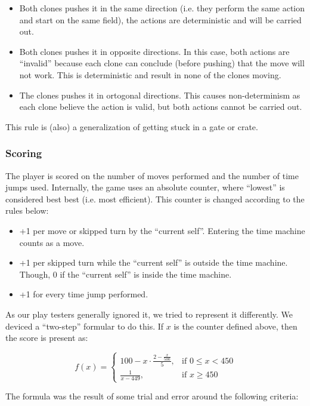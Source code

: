 \begin{itemize}
\item Both clones pushes it in the same direction (i.e. they perform
  the same action and start on the same field), the actions are
  deterministic and will be carried out.
\item Both clones pushes it in opposite directions.  In this case,
  both actions are ``invalid'' because each clone can conclude (before
  pushing) that the move will not work.  This is deterministic and
  result in none of the clones moving.
\item The clones pushes it in ortogonal directions.  This causes
  non-determinism as each clone believe the action is valid, but
  both actions cannot be carried out.
\end{itemize}

This rule is (also) a generalization of getting stuck in a gate or
crate.

\subsubsection{Scoring}
The player is scored on the number of moves performed and the number
of time jumps used.  Internally, the game uses an absolute counter,
where ``lowest'' is considered best best (i.e. most efficient).
This counter is changed according to the rules below:

\begin{itemize}
\item +1 per move or skipped turn by the ``current self''.
  Entering the time machine counts as a move.
\item +1 per skipped turn while the ``current self'' is outside
  the time machine.  Though, 0 if the ``current self'' is inside the
  time machine.
\item +1 for every time jump performed.
\end{itemize}

As our play testers generally ignored it, we tried to represent it
differently.  We deviced a ``two-step'' formular to do this.  If $x$
is the counter defined above, then the score is present as:

\[
f(x) =
\begin{cases}
100 - x \cdot \frac{2 - \frac{x}{500}}{5}, & \mbox{if } 0 \leq x < 450\\
\frac{1}{x - 449}, & \mbox{if } x \geq 450
\end{cases}
\]

The formula was the result of some trial and error around the following
criteria:

